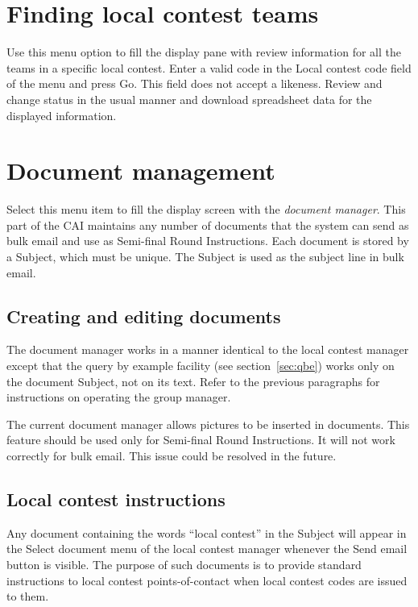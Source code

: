 \documentclass[11pt,letterpaper]{refart}
\def\ui#1{\textsf{#1}}
\begin{document}
\section{Finding local contest teams}
Use this menu option to fill the display pane with review information
for all the teams in a specific local contest. Enter a valid code in
the \ui{Local contest code} field of the menu and press \ui{Go}. This
field does not accept a likeness. Review and change status in the
usual manner and download spreadsheet data for the displayed
information.

\section{Document management}
\label{sec:documentmanagement}
Select this menu item to fill the display screen with the
\emph{document manager}. This part of the CAI maintains any number of
documents that the system can send as bulk email and use as Semi-final
Round Instructions. Each document is stored by a Subject, which must
be unique. The Subject is used as the subject line in bulk email.

\subsection{Creating and editing documents}
The document manager works in a manner identical to the local contest
manager except that the query by example facility (see
section~\ref{sec:qbe}) works only on the document Subject, not on its
text. Refer to the previous paragraphs for instructions on operating
the group manager.

The current document manager allows pictures to be inserted in
documents. This feature should be used only for Semi-final Round
Instructions. It will not work correctly for bulk email. This issue
could be resolved in the future.

\subsection{Local contest instructions}
Any document containing the words ``local contest'' in the Subject
will appear in the \ui{Select document} menu of the local contest
manager whenever the \ui{Send email} button is visible. The purpose of
such documents is to provide standard instructions to local contest
points-of-contact when local contest codes are issued to them.
\end{document}
